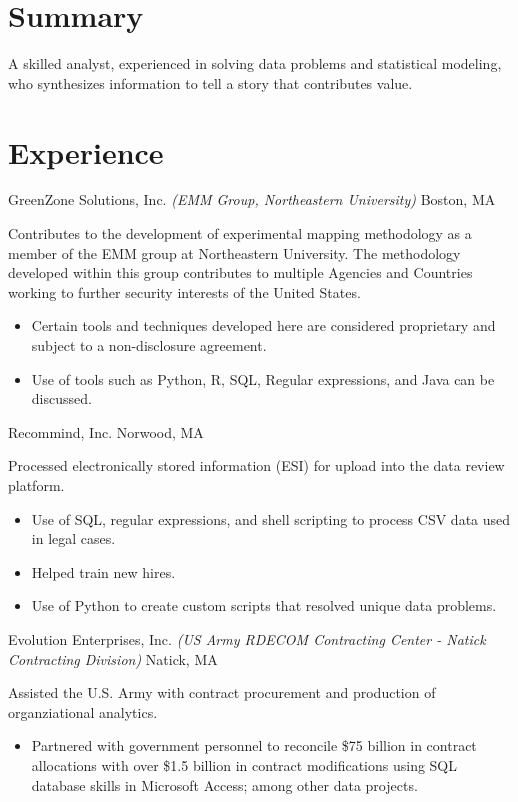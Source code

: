 \documentclass[10pt,a4paper]{moderncv}
\begin{document}
\makecvtitle
\section{Summary}
{A skilled analyst, experienced in solving data problems and statistical
  modeling, who synthesizes information to tell a story that contributes
  value.}
\section{Experience}
         {GreenZone Solutions, Inc.}
         {\textit{(EMM Group, Northeastern University)} Boston, MA}
         {}{\newline Contributes to the development of experimental
           mapping methodology as a member of the EMM group at
           Northeastern University. The methodology developed within
           this group contributes to multiple Agencies and Countries
           working to further security interests of the United States.
           \newline
           \begin{itemize}
           \item Certain tools and techniques developed here are
             considered proprietary and subject to a non-disclosure
             agreement.
           \item Use of tools such as Python, R, SQL, Regular
             expressions, and Java can be discussed.
           \end{itemize}
         }

         {Recommind, Inc.}
         {Norwood, MA}
         {}{Processed electronically stored information (ESI) for
           upload into the data review platform.
           \newline
           \begin{itemize}
           \item Use of SQL, regular expressions, and shell scripting
             to process CSV data used in legal cases.
           \item Helped train new hires.
           \item Use of Python to create custom scripts that resolved
             unique data problems.
           \end{itemize}}

         {Evolution Enterprises, Inc.}
         {\textit{(US Army RDECOM Contracting Center - Natick Contracting Division)} Natick, MA}
         {}{Assisted the U.S. Army with contract procurement and
           production of organziational analytics.
           \newline
           \begin{itemize}
           \item Partnered with government personnel to reconcile
             \$75 billion in contract allocations with over \$1.5
             billion in contract modifications using SQL database
             skills in Microsoft Access; among other data projects.
         \end{itemize}}
\end{document}
